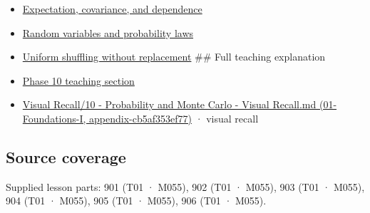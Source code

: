 \begin{itemize}
\item
  \hyperref[appendix-54c383df9992]{Expectation, covariance, and dependence}
\item
  \hyperref[appendix-4d0203f7944f]{Random variables and probability laws}
\item
  \hyperref[appendix-184fcc411663]{Uniform shuffling without replacement} \#\# Full teaching explanation
\item
  \hyperref[02-foundations-ii-ch023-a-probability-model-begins-with-possible-outcomes]{Phase 10 teaching section}
\item
  \href{../01-Foundations-I/main.pdf\#nameddest=appendix-cb5af353ef77}{Visual Recall/10 - Probability and Monte Carlo - Visual Recall.md (01-Foundations-I, appendix-cb5af353ef77)} · visual recall
\end{itemize}

\subsection{Source coverage}\label{appendix-f1ef323f6ed7-source-coverage}

Supplied lesson parts: 901 (T01 · M055), 902 (T01 · M055), 903 (T01 · M055), 904 (T01 · M055), 905 (T01 · M055), 906 (T01 · M055).
